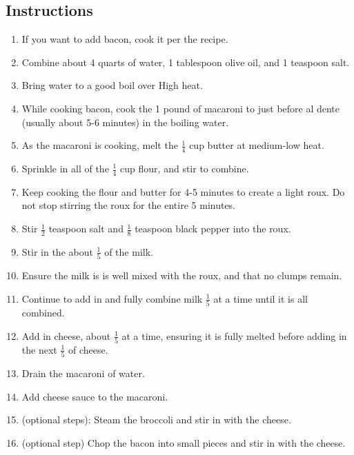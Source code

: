 \begin{multicols}{2}
\subsection*{Instructions}
\begin{enumerate}
    \item If you want to add bacon, cook it per the  recipe.
    \item Combine about 4 quarts of water, 1 tablespoon olive oil, and 1 teaspoon salt.
    \item Bring water to a good boil over High heat.
    \item While cooking bacon, cook the 1 pound of macaroni to just before al dente (usually about 5-6 minutes) in the boiling water.
    \item As the macaroni is cooking, melt the \( \frac{1}{4} \) cup butter at medium-low heat.
    \item Sprinkle in all of the \( \frac{1}{4} \) cup flour, and stir to combine.
    \item Keep cooking the flour and butter for 4-5 minutes to create a light roux. Do not stop stirring the roux for the entire 5 minutes.
    \item Stir \( \frac{1}{2} \) teaspoon salt and \( \frac{1}{8} \) teaspoon black pepper into the roux.
    \item Stir in the about \( \frac{1}{5} \) of the milk.
    \item Ensure the milk is is well mixed with the roux, and that no clumps remain.
    \item Continue to add in and fully combine milk \( \frac{1}{5} \) at a time until it is all combined.
    \item Add in cheese, about \( \frac{1}{5} \) at a time, ensuring it is fully melted before adding in the next \( \frac{1}{5} \) of cheese.
    \item Drain the macaroni of water.
    \item Add cheese sauce to the macaroni.
    \item (optional steps): Steam the broccoli and stir in with the cheese.
    \item (optional step) Chop the bacon into small pieces and stir in with the cheese.

\end{enumerate}


\end{multicols}
